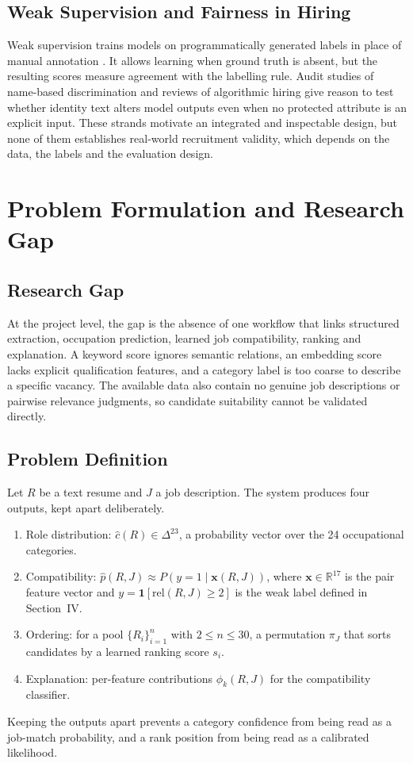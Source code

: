 \documentclass[conference]{IEEEtran}
\begin{document}
\subsection{Weak Supervision and Fairness in Hiring}
Weak supervision trains models on programmatically generated labels in place of manual annotation \cite{b11}. It allows learning when ground truth is absent, but the resulting scores measure agreement with the labelling rule. Audit studies of name-based discrimination \cite{b12} and reviews of algorithmic hiring \cite{b13} give reason to test whether identity text alters model outputs even when no protected attribute is an explicit input. These strands motivate an integrated and inspectable design, but none of them establishes real-world recruitment validity, which depends on the data, the labels and the evaluation design.

\section{Problem Formulation and Research Gap}
\subsection{Research Gap}
At the project level, the gap is the absence of one workflow that links structured extraction, occupation prediction, learned job compatibility, ranking and explanation. A keyword score ignores semantic relations, an embedding score lacks explicit qualification features, and a category label is too coarse to describe a specific vacancy. The available data also contain no genuine job descriptions or pairwise relevance judgments, so candidate suitability cannot be validated directly.

\subsection{Problem Definition}
Let $R$ be a text resume and $J$ a job description. The system produces four outputs, kept apart deliberately.
\begin{enumerate}
\item Role distribution: $\hat{c}(R)\in\Delta^{23}$, a probability vector over the 24 occupational categories.
\item Compatibility: $\hat{p}(R,J)\approx P(y=1\mid \mathbf{x}(R,J))$, where $\mathbf{x}\in\mathbb{R}^{17}$ is the pair feature vector and $y=\mathbf{1}[\mathrm{rel}(R,J)\ge 2]$ is the weak label defined in Section~IV.
\item Ordering: for a pool $\{R_i\}_{i=1}^{n}$ with $2\le n\le 30$, a permutation $\pi_J$ that sorts candidates by a learned ranking score $s_i$.
\item Explanation: per-feature contributions $\phi_k(R,J)$ for the compatibility classifier.
\end{enumerate}
Keeping the outputs apart prevents a category confidence from being read as a job-match probability, and a rank position from being read as a calibrated likelihood.
\end{document}
